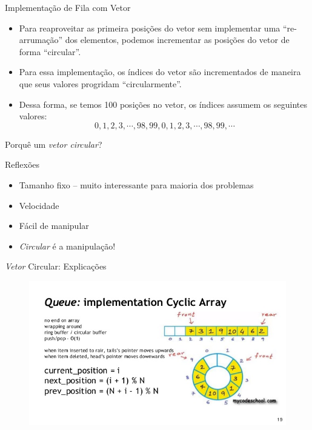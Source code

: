 \begin{frame}{Implementação de Fila com Vetor}		
	\begin{itemize}		
		\item Para reaproveitar as primeira posições do vetor sem implementar uma ``re-arrumação'' dos elementos, podemos incrementar as posições do vetor de forma ``circular''.
		\item Para essa implementação, os índices do vetor são incrementados de maneira que seus valores progridam ``circularmente''. 
		\item Dessa forma, se temos 100 posições no vetor, os índices assumem os seguintes valores:
		$$0, 1, 2, 3, \cdots, 98, 99, 0, 1, 2, 3, \cdots, 98, 99, \cdots$$
	\end{itemize}
\end{frame}




\begin{frame}{Porquê um \textit{vetor circular}?}

\begin{block}{Reflexões}
  \begin{itemize}
    \item Tamanho fixo -- muito interessante para maioria dos problemas
    \item Velocidade
    \item Fácil de manipular
    \item \textit{Circular} é a manipulação!
    
    
  \end{itemize}
\end{block}

\end{frame}

\begin{frame}{\textit{Vetor} Circular: Explicações}

\begin{figure}[ht!]
				\centering
				\includegraphics[width=.8\textwidth,height=.6\textheight]{figs/fig_filas/fila_circular_explicacao_01.jpg}
			\end{figure} 

\end{frame}

